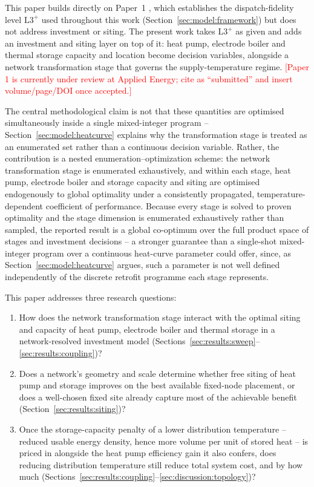 \documentclass[review,3p]{elsarticle}
\newcommand{\placeholder}[1]{\textcolor{red}{[#1]}}
\newcommand{\Lplus}{\mathrm{L3}^{+}}
\begin{document}
This paper builds directly on Paper~1 \cite{Ruess.2026}, which
establishes the dispatch-fidelity level $\Lplus$ used throughout this
work (Section~\ref{sec:model:framework}) but does not address investment
or siting. The present work takes $\Lplus$ as given and adds an
investment and siting layer on top of it: heat pump, electrode boiler
and thermal storage capacity and location become decision variables,
alongside a network transformation stage that governs the
supply-temperature regime.
\placeholder{Paper 1 is currently under review at Applied Energy; cite
as ``submitted'' and insert volume/page/DOI once accepted.}

The central methodological claim is not that these quantities are
optimised simultaneously inside a single mixed-integer program --
Section~\ref{sec:model:heatcurve} explains why the transformation stage
is treated as an enumerated set rather than a continuous decision
variable. Rather, the contribution is a nested
enumeration--optimization scheme: the network transformation stage is
enumerated exhaustively, and within each stage, heat pump, electrode
boiler and storage capacity and siting are optimised endogenously to
global optimality under a consistently propagated, temperature-dependent
coefficient of performance. Because every stage is solved to proven
optimality and the stage dimension is enumerated exhaustively rather
than sampled, the reported result is a global co-optimum over the full
product space of stages and investment decisions -- a stronger guarantee
than a single-shot mixed-integer program over a continuous heat-curve
parameter could offer, since, as Section~\ref{sec:model:heatcurve}
argues, such a parameter is not well defined independently of the
discrete retrofit programme each stage represents.

This paper addresses three research questions:
\begin{enumerate}[label=\textbf{RQ\arabic*.}, leftmargin=2.2em]
\item How does the network transformation stage interact with the
optimal siting and capacity of heat pump, electrode boiler and thermal
storage in a network-resolved investment model
(Sections~\ref{sec:results:sweep}--\ref{sec:results:coupling})?
\item Does a network's geometry and scale determine whether free siting
of heat pump and storage improves on the best available fixed-node
placement, or does a well-chosen fixed site already capture most of the
achievable benefit (Section~\ref{sec:results:siting})?
\item Once the storage-capacity penalty of a lower distribution
temperature -- reduced usable energy density, hence more volume per
unit of stored heat -- is priced in alongside the heat pump efficiency
gain it also confers, does reducing distribution temperature still
reduce total system cost, and by how much
(Sections~\ref{sec:results:coupling}--\ref{sec:discussion:topology})?
\end{enumerate}
\end{document}
